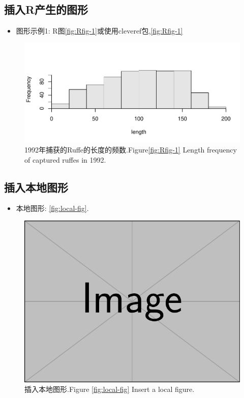 \documentclass[12pt,a4paper,zihao=-4,UTF8]{book}
\providecommand{\tightlist}{%
  \setlength{\itemsep}{0pt}\setlength{\parskip}{0pt}}
\begin{document}
\subsection{插入R产生的图形}\label{r}

\begin{itemize}
\tightlist
\item
  图形示例1: R图\ref{fig:Rfig-1}或使用cleveref包,\cref{fig:Rfig-1}
\end{itemize}

\begin{figure}[h]

{\centering \includegraphics[width=0.7\linewidth]{figures/unnamed-chunk-10-1} 

}

\caption{\label{fig:Rfig-1}1992年捕获的Ruffe的长度的频数.\protect\linebreak Figure\ref{fig:Rfig-1} Length frequency of captured ruffes in 1992.}\label{fig:unnamed-chunk-10}
\end{figure}

\subsection{插入本地图形}

\begin{itemize}
\tightlist
\item
  本地图形: \cref{fig:local-fig}.
\end{itemize}

\begin{figure}[h]

{\centering \includegraphics[width=0.7\linewidth]{figures/example-image} 

}

\caption{\label{fig:local-fig}插入本地图形.\protect\linebreak Figure \ref{fig:local-fig}  Insert a local figure.}\label{fig:locfig}
\end{figure}
\end{document}
